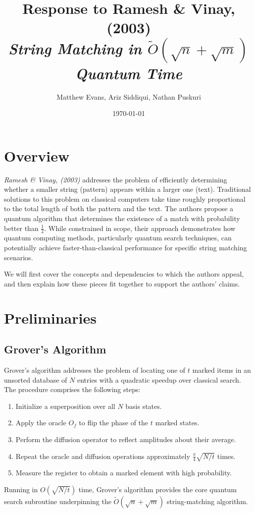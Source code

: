 \documentclass[12pt]{IEEEtran}
\title{\Large{Response to Ramesh \& Vinay, (2003)\\ \small{\textit{String Matching in \(\tilde{O}(\sqrt{n} + \sqrt{m})\) Quantum Time}} }}
\author{%
\normalsize{Matthew Evans, Ariz Siddiqui, Nathan Puskuri}
}
\date{\today}
\begin{document}
\maketitle

\section{Overview}
\textit{Ramesh \& Vinay, (2003)}\cite{RameshH2003SmiO} addresses the problem of efficiently determining whether a smaller string (pattern) appears within a larger one (text). Traditional solutions to this problem on classical computers take time roughly proportional to the total length of both the pattern and the text. The authors propose a quantum algorithm that determines the existence of a match with probability better than \(\frac{1}{2}\). While constrained in scope, their approach demonstrates how quantum computing methods, particularly quantum search techniques, can potentially achieve faster-than-classical performance for specific string matching scenarios.

We will first cover the concepts and dependencies to which the authors appeal, and then explain how these pieces fit together to support the authors' claims.

\section{Preliminaries}
\subsection{Grover's Algorithm}
Grover's algorithm \cite{grover1996fastquantummechanicalalgorithm} addresses the problem of locating one of \(t\) marked items in an unsorted database of \(N\) entries with a quadratic speedup over classical search. The procedure comprises the following steps:
\begin{enumerate}
    \item Initialize a superposition over all \(N\) basis states.
    \item Apply the oracle \(O_f\) to flip the phase of the \(t\) marked states.
    \item Perform the diffusion operator to reflect amplitudes about their average.
    \item Repeat the oracle and diffusion operations approximately \(\frac{\pi}{4}\sqrt{N/t}\) times.
    \item Measure the register to obtain a marked element with high probability.
\end{enumerate}
Running in \(O(\sqrt{N/t})\) time, Grover's algorithm provides the core quantum search subroutine underpinning the \(\widetilde{O}(\sqrt{n}+\sqrt{m})\) string-matching algorithm.
\end{document}
